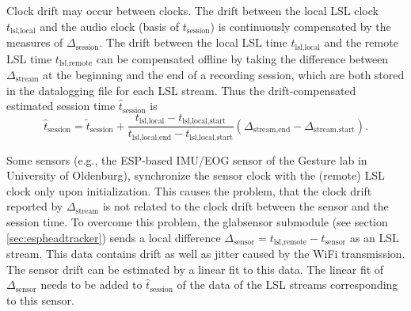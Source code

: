 Clock drift may occur between clocks. The drift between the local LSL
clock $t_\text{lsl,local}$ and the audio clock (basis of
$t_\text{session}$) is continuously compensated by the measures of
$\Delta_\text{session}$. The drift between the local LSL time
$t_\text{lsl,local}$ and the remote LSL time $t_\text{lsl,remote}$ can
be compensated offline by taking the difference between
$\Delta_\text{stream}$ at the beginning and the end of a recording
session, which are both stored in the datalogging file for each LSL
stream. Thus the drift-compensated estimated session time
$\hat{t}_\text{session}$ is
\begin{equation}
\hat{t}_\text{session} = \tilde{t}_\text{session} + \frac{t_\text{lsl,local}-t_\text{lsl,local,start}}{t_\text{lsl,local,end}-t_\text{lsl,local,start}} (\Delta_\text{stream,end}-\Delta_\text{stream,start}).
\end{equation}

Some sensors (e.g., the ESP-based IMU/EOG sensor of the Gesture lab in
University of Oldenburg), synchronize the sensor clock with the
(remote) LSL clock only upon initialization. This causes the problem,
that the clock drift reported by $\Delta_\text{stream}$ is not related
to the clock drift between the sensor and the session time. To
overcome this problem, the  glabsensor submodule
(see section \ref{sec:espheadtracker}) sends a local difference
$\Delta_\text{sensor}=t_\text{lsl,remote}-t_\text{sensor}$ as an LSL
stream. This data contains drift as well as jitter caused by the WiFi
transmission. The sensor drift can be estimated by a linear fit to
this data. The linear fit of $\Delta_\text{sensor}$ needs to be added
to $\hat{t}_\text{session}$ of the data of the LSL streams
corresponding to this sensor.

